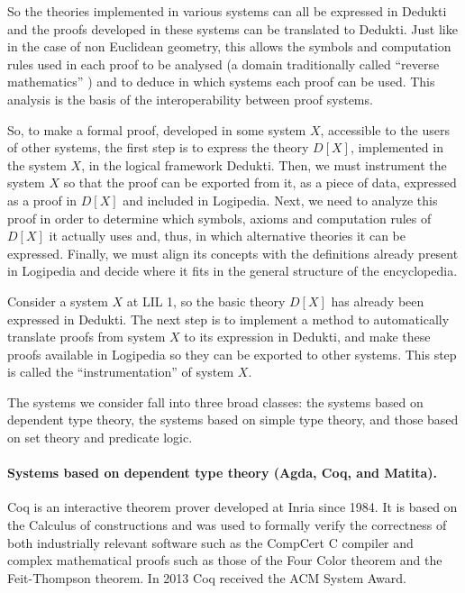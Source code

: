 So the theories implemented in various systems can all be expressed in
Dedukti and the proofs developed in these systems can be translated to
Dedukti. Just like in the case of non Euclidean geometry, this allows
the symbols and computation rules used in each proof to be analysed
\cite{Thire18,Dowek17} (a domain traditionally called ``reverse
mathematics'' \cite{Friedman76,Simpson09}) and to deduce in which
systems each proof can be used.  This analysis is the basis of the
interoperability between proof systems.

So, to make a formal proof, developed in some system $X$, accessible
to the users of other systems, the first step is to express the theory
$D[X]$, implemented in the system $X$, in the logical framework
Dedukti.  Then, we must instrument the system $X$ so that the proof
can be exported from it, as a piece of data, expressed as a proof in
$D[X]$ and included in Logipedia. Next, we need to analyze this proof
in order to determine which symbols, axioms and computation rules of
$D[X]$ it actually uses and, thus, in which alternative theories it
can be expressed.  Finally, we must align its concepts with the
definitions already present in Logipedia and decide where it fits in
the general structure of the encyclopedia.


Consider a system $X$ at LIL 1, so the basic theory $D[X]$ has already
been expressed in Dedukti. The next step is to implement a method to
automatically translate proofs from system $X$ to its expression in
Dedukti, and make these proofs available in Logipedia so they can be
exported to other systems. This step is called the
``instrumentation'' of system $X$.

The systems we consider fall into three broad classes: the systems
based on dependent type theory, the systems based on simple type
theory, and those based on set theory and predicate logic.

\paragraph*{Systems based on dependent type theory (Agda, Coq, and Matita).}

Coq is an interactive theorem prover developed at Inria since 1984.
It is based on the Calculus of constructions and was used to formally
verify the correctness of both industrially relevant software such as
the CompCert C compiler and complex mathematical proofs such as those
of the Four Color theorem and the Feit-Thompson theorem. In 2013 Coq
received the ACM System Award.

